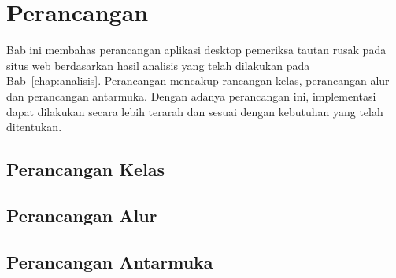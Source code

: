 \chapter{Perancangan}
\label{chap:perancangan}

Bab ini membahas perancangan aplikasi desktop pemeriksa tautan rusak pada situs web berdasarkan hasil analisis yang telah dilakukan pada Bab~\ref{chap:analisis}. Perancangan mencakup rancangan kelas, perancangan alur dan perancangan antarmuka. Dengan adanya perancangan ini, implementasi dapat dilakukan secara lebih terarah dan sesuai dengan kebutuhan yang telah ditentukan.


\section{Perancangan Kelas}
\label{sec:04-perancangan-kelas}
% 


\section{Perancangan Alur}
\label{sec:04-perancangan-alur}
% 


\section{Perancangan Antarmuka}
\label{sec:04-perancangan-antarmuka}
% 
